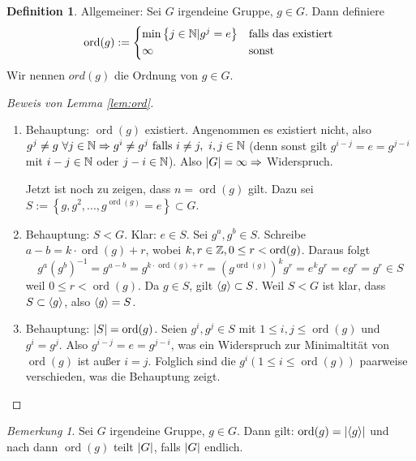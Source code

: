 \documentclass[12pt,a4paper]{article}
\newcounter{defcounter}[subsection]
\theoremstyle{definition}
\newtheorem{defi}[defcounter]{Definition}
\theoremstyle{remark}
\newtheorem*{bem}{Bemerkung}
\theoremstyle{definition}
\theoremstyle{definition}
\theoremstyle{plain}
\theoremstyle{plain}
\DeclarePairedDelimiter{\abs}{\lvert}{\rvert}
\DeclareMathOperator{\ord}{ord}
\begin{document}
\begin{defi}
	Allgemeiner: Sei $G$ irgendeine Gruppe, $g \in G$. Dann definiere \begin{equation*}
		\ord(g) := \begin{cases*}
		\min \left\lbrace j \in \IN | g^j = e\right\rbrace &falls das existiert \\
		\infty &sonst
		\end{cases*}
	\end{equation*}
	Wir nennen $ord(g)$ die Ordnung von $g \in G$.
\end{defi}

\begin{proof} [Beweis von Lemma \ref{lem:ord}]
	\begin{enumerate}
	\item Behauptung: $\ord(g)$ existiert. Angenommen es existiert nicht, also 
	$
		g^j \not = g ~ \forall j \in \mathbb N \Rightarrow g^i \neq g^j \text{ falls } i \neq j, ~ i,j \in \mathbb N 
	$
	(denn sonst gilt $g^{i-j}=e=g^{j-i}$ mit $i-j \in \mathbb N$ oder $j-i \in \mathbb N$).
	Also $\abs G = \infty \Rightarrow$ Widerspruch.
	
	Jetzt ist noch zu zeigen, dass $n = \ord(g)$ gilt. Dazu sei $S := \left\lbrace g, g^2, ..., g^{\ord(g)} = e \right\rbrace \subset G$.
	
	\item Behauptung: $S < G$. Klar: $e \in S$. Sei $g^a, g^b \in S$. Schreibe $a-b = k \cdot \ord(g) + r$, wobei $k, r \in \IZ, 0 \leq r < \ord(g)$. Daraus folgt
	\begin{equation*}
		g^a\left( g^b \right)^{-1}=g^{a-b}=g^{k \cdot \ord(g)+r}
		= \left(g^{\ord(g)} \right)^kg^r = e^kg^r=eg^r=g^r \in S
	\end{equation*}
	weil $0 \leq r < \ord(g)$.
	Da $g \in S$, gilt $\langle g\rangle\subset S$. Weil $S < G$ ist klar, dass $S \subset \langle g\rangle$, also $\langle g\rangle = S$.
	\item Behauptung: $\abs S = \ord(g)$. Seien $g^i, g^j \in S$ mit $1 \leq i,j \leq \ord(g)$ und $g^i=g^j$. Also $g^{i-j} = e = g^{j-i}$, was ein Widerspruch zur Minimaltität von $\ord(g)$ ist außer $i=j$. Folglich sind die $g^i (1\leq i \leq \ord(g))$ paarweise verschieden, was die Behauptung zeigt.
	\end{enumerate}
\end{proof}

\begin{bem}
	Sei $G$ irgendeine Gruppe, $g\in G$. Dann gilt: $\ord(g) = \abs{\<g\>}$ und nach  dann $\ord(g)$ teilt $\abs G$, falls $\abs G$ endlich.
\end{bem}
\end{document}

